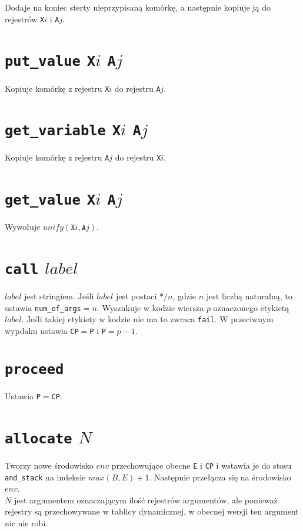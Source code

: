 Dodaje na koniec sterty nieprzypisaną komórkę, a następnie kopiuje ją do rejestrów \texttt{X}$i$ i \texttt{A}$j$.

\section{\texttt{put\_value} \texttt{X}$i$ \texttt{A}$j$}

Kopiuje komórkę z rejestru \texttt{X}$i$ do rejestru \texttt{A}$j$.

\section{\texttt{get\_variable} \texttt{X}$i$ \texttt{A}$j$}

Kopiuje komórkę z rejestru \texttt{A}$j$ do rejestru \texttt{X}$i$.

\section{\texttt{get\_value} \texttt{X}$i$ \texttt{A}$j$}

Wywołuje $unify(\texttt{X}i, \texttt{A}j)$.

\section{\texttt{call} $label$}

$label$ jest stringiem. Jeśli $label$ jest postaci $*/n$, gdzie $n$ jest liczbą naturalną, to ustawia \texttt{num\_of\_args}$ = n$. Wyszukuje w kodzie wiersza $p$ oznaczonego etykietą $label$. Jeśli takiej etykiety w kodzie nie ma to zwraca \texttt{fail}.
W przeciwnym wypdaku ustawia \texttt{CP}$ = $\texttt{P} i \texttt{P}$ = p - 1$.

\section{\texttt{proceed}}

Ustawia \texttt{P}$ = $\texttt{CP}.

\section{\texttt{allocate} $N$}

Tworzy nowe środowisko $env$ przechowujące obecne \texttt{E} i \texttt{CP} i wstawia je do stosu \texttt{and\_stack} na indeksie $max(B,E)+1$. Następnie przełącza się na środowisko $env$.\\
$N$ jest argumentem oznaczającym ilość rejestrów argumentów, ale ponieważ rejestry są przechowywane w tablicy dynamicznej, w obecnej wersji ten argument nic nie robi.

